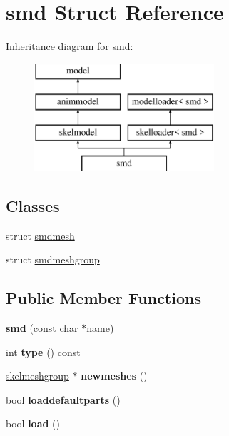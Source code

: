 \hypertarget{structsmd}{}\section{smd Struct Reference}
\label{structsmd}
Inheritance diagram for smd\+:\begin{figure}[H]
\begin{center}
\leavevmode
\includegraphics[height=4.000000cm]{structsmd}
\end{center}
\end{figure}
\subsection*{Classes}
\begin{DoxyCompactItemize}
\item 
struct \hyperlink{structsmd_1_1smdmesh}{smdmesh}
\item 
struct \hyperlink{structsmd_1_1smdmeshgroup}{smdmeshgroup}
\end{DoxyCompactItemize}
\subsection*{Public Member Functions}
\begin{DoxyCompactItemize}
\item 
\mbox{\label{structsmd_ae88cec1afaa2de4ec0e1aed76407625e}} 
{\bfseries smd} (const char $\ast$name)
\item 
\mbox{\label{structsmd_af1df777a3ce23cb5172adb45c59910cd}} 
int {\bfseries type} () const
\item 
\mbox{\label{structsmd_af678999b4716cf2fc4c47dff18ea6f63}} 
\hyperlink{structskelmodel_1_1skelmeshgroup}{skelmeshgroup} $\ast$ {\bfseries newmeshes} ()
\item 
\mbox{\label{structsmd_ae8f7383a8fd5bd0e5f1aff5351425e74}} 
bool {\bfseries loaddefaultparts} ()
\item 
\mbox{\label{structsmd_a971baacdf1d2466fb4a89381ebb03c0b}} 
bool {\bfseries load} ()
\end{DoxyCompactItemize}
